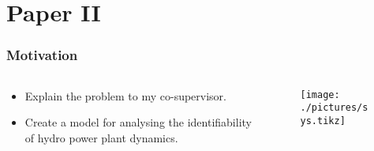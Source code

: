 \section{Paper II}
\begin{frame}
		\frametitle{Motivation}
		\begin{columns}
				\begin{column}{0.4\textwidth}
						\begin{itemize}
								\item Explain the problem to my co-supervisor.
								\item Create a model for analysing the identifiability of hydro power plant dynamics.
						\end{itemize}
				\end{column}
				\begin{column}{0.6\textwidth}
						\begin{figure}
								\texttt{[image: ./pictures/sys.tikz]}
						\end{figure}
				\end{column}
		\end{columns}
\end{frame}
